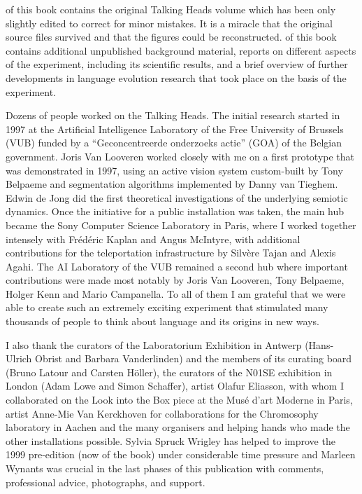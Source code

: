  of this book contains the original Talking Heads volume which has been only 
slightly edited to correct for minor mistakes. It is a miracle that the original source files survived and that the 
figures could be reconstructed.  of this book contains additional unpublished background 
material, reports on different aspects of the experiment, including its scientific results, and 
a brief overview of further developments in language evolution research that took place on the basis of the experiment. 

Dozens of people worked on the Talking Heads. The initial research started in 1997 at the Artificial Intelligence 
Laboratory of the Free University of Brussels (VUB) funded by a ``Geconcentreerde onderzoeks actie'' (GOA)
of the Belgian government. Joris Van Looveren worked closely with me on a first prototype 
that was demonstrated in 1997, using an active vision system custom-built by Tony Belpaeme and segmentation 
algorithms implemented by Danny van Tieghem. Edwin de Jong did the first theoretical investigations of the underlying 
semiotic dynamics. Once the initiative for a public installation was taken,  
the main hub became the Sony Computer Science Laboratory in Paris, 
where I worked together intensely with Fr\'{e}d\'{e}ric Kaplan and Angus McIntyre, with additional contributions for the 
teleportation infrastructure by Silv\`{e}re Tajan and Alexis Agahi. The AI Laboratory of the VUB remained
a second hub where important contributions were 
made most notably by Joris Van Looveren, Tony Belpaeme, Holger Kenn and Mario Campanella. To all of them I 
am grateful that we were able to create such an extremely exciting experiment that stimulated many 
thousands of people to think about language and its origins in new ways. 

I also thank the curators of the Laboratorium Exhibition in Antwerp (Hans-Ulrich Obrist and Barbara Vanderlinden) 
and the members of its curating board (Bruno Latour and Carsten H\"oller), the curators of the N01SE exhibition 
in London (Adam Lowe and Simon Schaffer), artist Olafur Eliasson, with whom I collaborated on the Look into the Box 
piece at the Mus\'e d'art Moderne in Paris, artist Anne-Mie Van Kerckhoven for collaborations for the Chromosophy 
laboratory in Aachen and the many organisers and helping hands who made the other installations possible. 
Sylvia Spruck Wrigley has helped to improve the 1999 pre-edition (now  of the book) 
under considerable time pressure and Marleen Wynants was crucial in the last phases of this publication with comments,
professional advice, photographs, and support. 

